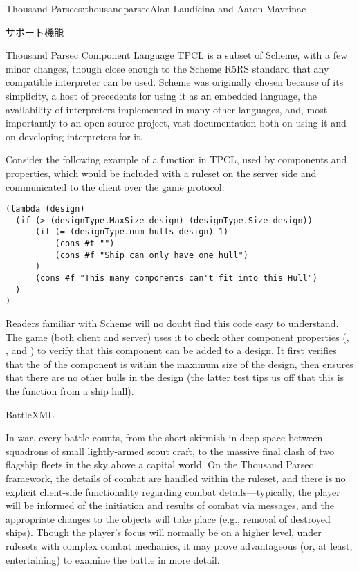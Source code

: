 \begin{aosachapter}{Thousand Parsec}{s:thousandparsec}{Alan Laudicina and Aaron Mavrinac}
\begin{aosasect1}{サポート機能}
\begin{aosasect2}{Thousand Parsec Component Language}
TPCL is a subset of Scheme, with a few minor changes, though close
enough to the Scheme R5RS standard that any compatible interpreter can
be used. Scheme was originally chosen because of its simplicity, a
host of precedents for using it as an embedded language, the
availability of interpreters implemented in many other languages, and,
most importantly to an open source project, vast documentation both on
using it and on developing interpreters for it.

Consider the following example of a  function in
TPCL, used by components and properties, which would be included with
a ruleset on the server side and communicated to the client over the
game protocol:

\begin{verbatim}
(lambda (design)
  (if (> (designType.MaxSize design) (designType.Size design))
      (if (= (designType.num-hulls design) 1)
          (cons #t "")
          (cons #f "Ship can only have one hull")
      )
      (cons #f "This many components can't fit into this Hull")
  )
)
\end{verbatim}

Readers familiar with Scheme will no doubt find this code easy to
understand. The game (both client and server) uses it to check other
component properties (, , and
) to verify that this component can be added to a
design. It first verifies that the  of the component is
within the maximum size of the design, then ensures that there are no
other hulls in the design (the latter test tips us off that this is
the  function from a ship hull).

\end{aosasect2}

\begin{aosasect2}{BattleXML}

In war, every battle counts, from the short skirmish in deep space
between squadrons of small lightly-armed scout craft, to the massive
final clash of two flagship fleets in the sky above a capital
world. On the Thousand Parsec framework, the details of combat are
handled within the ruleset, and there is no explicit client-side
functionality regarding combat details---typically, the player will be
informed of the initiation and results of combat via messages, and the
appropriate changes to the objects will take place (e.g., removal of
destroyed ships). Though the player's focus will normally be on a
higher level, under rulesets with complex combat mechanics, it may
prove advantageous (or, at least, entertaining) to examine the battle
in more detail.


\end{aosasect2}
\end{aosasect1}
\end{aosachapter}
